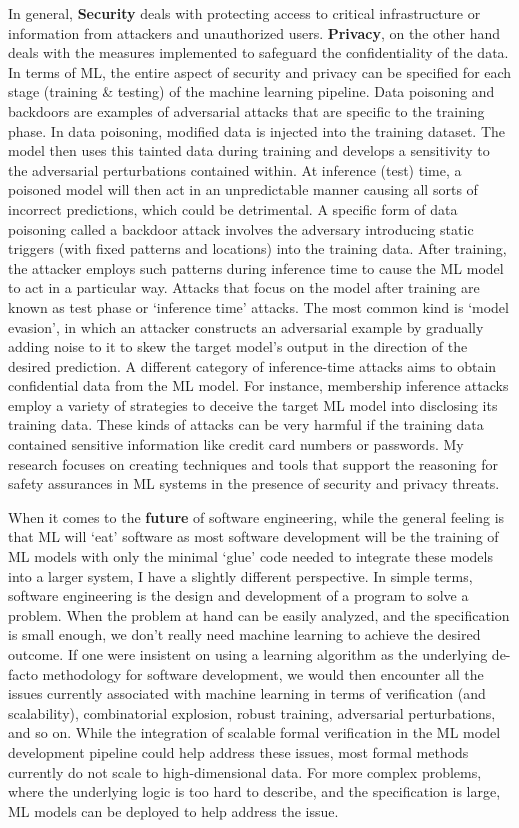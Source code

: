 \documentclass[11pt]{article}
\begin{document}
\par{In general, \textbf{Security} deals with protecting access to critical infrastructure or information from attackers and unauthorized users. \textbf{Privacy}, on the other hand deals with the measures implemented to safeguard the confidentiality of the data. In terms of ML, the entire aspect of security and privacy can be specified for each stage (training \& testing) of the machine learning pipeline. Data poisoning and backdoors are examples of adversarial attacks that are specific to the training phase. In  data poisoning, modified data is injected into the training dataset. The model then uses this tainted data during training and develops a sensitivity to the adversarial perturbations contained within. At inference (test) time, a poisoned model will then act in an unpredictable manner causing all sorts of incorrect predictions, which could be detrimental. A specific form of data poisoning called a backdoor attack involves the adversary introducing static triggers (with fixed patterns and locations) into the training data. After training, the attacker employs such patterns during inference time to cause the ML model to act in a particular way. Attacks that focus on the model after training are known as test phase or `inference time' attacks. The most common kind is `model evasion', in which an attacker constructs an adversarial example by gradually adding noise to it to skew the target model's output in the direction of the desired prediction. A different category of inference-time attacks aims to obtain confidential data from the ML model. For instance, membership inference attacks employ a variety of strategies to deceive the target ML model into disclosing its training data. These kinds of attacks can be very harmful if the training data contained sensitive information like credit card numbers or passwords. My research focuses on creating techniques and tools that support the reasoning for safety assurances in ML systems in the presence of security and privacy threats. }
\\
\par{When it comes to the \textbf{future} of software engineering, while the general feeling is that ML will ‘eat’ software as most software development will be the training of ML models with only the minimal ‘glue’ code needed to integrate these models into a larger system, I have a slightly different perspective. In simple terms, software engineering is the design and development of a program to solve a problem. When the problem at hand can be easily analyzed, and the specification is small enough, we don’t really need machine learning to achieve the desired outcome. If one were insistent on using a learning algorithm as the underlying de-facto methodology for software development, we would then encounter all the issues currently associated with machine learning in terms of verification (and scalability), combinatorial explosion, robust training, adversarial perturbations, and so on. While the integration of scalable formal verification in the ML model development pipeline could help address these issues, most formal methods currently do not scale to high-dimensional data. For more complex problems, where the underlying logic is too hard to describe, and the specification is large, ML models can be deployed to help address the issue.}
\end{document}
